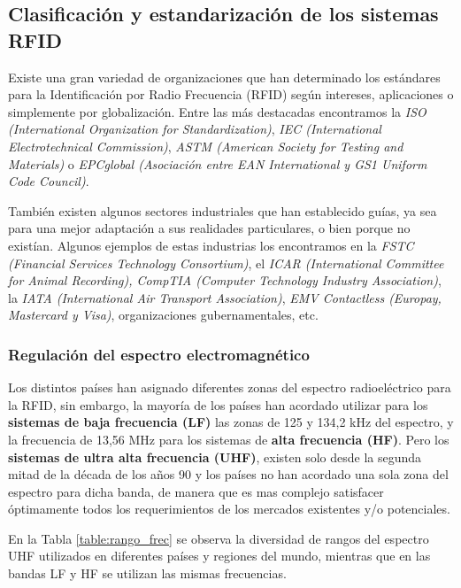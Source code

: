\subsection{Clasificación y estandarización de los sistemas RFID}

Existe una gran variedad de organizaciones que han determinado los estándares para la Identificación por Radio Frecuencia (RFID) según intereses, aplicaciones o simplemente por globalización. Entre las más destacadas encontramos la \textit{ISO (International Organization for Standardization)}, \textit{IEC (International Electrotechnical Commission)}, \textit{ASTM (American Society for Testing and Materials)} o \textit{EPCglobal (Asociación entre EAN International y GS1 Uniform Code Council)}.

También existen algunos sectores industriales que han establecido guías, ya sea para una mejor adaptación a sus realidades particulares, o bien porque no existían. Algunos ejemplos de estas industrias los encontramos en la \textit{FSTC (Financial Services Technology Consortium)}, el \textit{ICAR (International Committee for Animal Recording), CompTIA (Computer Technology Industry Association)}, la \textit{IATA (International Air Transport Association)}, \textit{EMV Contactless (Europay, Mastercard y Visa)}, organizaciones gubernamentales, etc.

\subsubsection{Regulación del espectro electromagnético}

Los distintos países han asignado diferentes zonas del espectro radioeléctrico para la RFID,  sin embargo, la mayoría de los países han acordado utilizar para los \textbf{sistemas de baja frecuencia (LF)} las zonas de 125 y 134,2 kHz del espectro, y la frecuencia de 13,56 MHz para los sistemas de \textbf{alta frecuencia (HF)}. Pero los \textbf{sistemas de ultra alta frecuencia (UHF)}, existen solo desde la segunda mitad de la década de los años 90 y los países no han acordado una sola zona del espectro para dicha banda, de manera que es mas complejo satisfacer óptimamente todos los requerimientos de los mercados existentes y/o potenciales.

En la Tabla \ref{table:rango_frec} se observa la diversidad de rangos del espectro UHF utilizados en diferentes países y regiones del mundo, mientras que en las bandas LF y HF se utilizan las mismas frecuencias.

